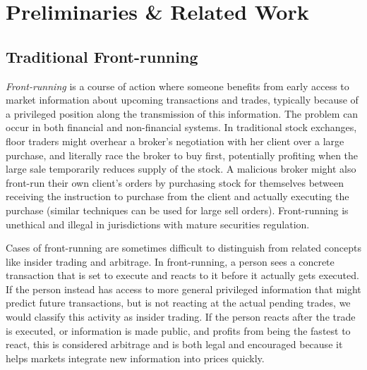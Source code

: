 
\section{Preliminaries \& Related Work}

\subsection{Traditional Front-running} 
\label{sec:What is front-running?}

\emph{Front-running} is a course of action where someone benefits from early access to market information about upcoming transactions and trades, typically because of a privileged position along the transmission of this information. The problem can occur in both financial and non-financial systems. In traditional stock exchanges, floor traders might overhear a broker's negotiation with her client over a large purchase, and literally race the broker to buy first, potentially profiting when the large sale temporarily reduces supply of the stock. A malicious broker might also front-run their own client's orders by purchasing stock for themselves between receiving the instruction to purchase from the client and actually executing the purchase (similar techniques can be used for large sell orders). Front-running is unethical and illegal in jurisdictions with mature securities regulation. 

Cases of front-running are sometimes difficult to distinguish from related concepts like insider trading and arbitrage. In front-running, a person sees a concrete transaction that is set to execute and reacts to it before it actually gets executed. If the person instead has access to more general privileged information that might predict future transactions, but is not reacting at the actual pending trades, we would classify this activity as insider trading. If the person reacts after the trade is executed, or information is made public, and profits from being the fastest to react, this is considered arbitrage and is both legal and encouraged because it helps markets integrate new information into prices quickly.


